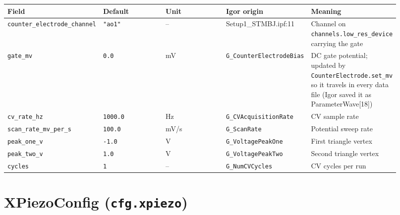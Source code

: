 \footnotesize\setlength{\LTleft}{0pt}\setlength{\LTright}{\fill}
\begin{longtable}{@{}>{\raggedright\arraybackslash}p{0.184\linewidth}>{\raggedright\arraybackslash}p{0.184\linewidth}>{\raggedright\arraybackslash}p{0.184\linewidth}>{\raggedright\arraybackslash}p{0.184\linewidth}>{\raggedright\arraybackslash}p{0.184\linewidth}@{}}
\toprule
\textbf{Field} & \textbf{Default} & \textbf{Unit} & \textbf{Igor origin} & \textbf{Meaning} \\
\midrule\endhead
\texttt{counter\_\discretionary{}{}{}electrode\_\discretionary{}{}{}channel} & \texttt{"ao1"} & -- & Setup1\_STMBJ.ipf:11 & Channel on \texttt{channels.\discretionary{}{}{}low\_\discretionary{}{}{}res\_\discretionary{}{}{}device} carrying the gate \\
\texttt{gate\_\discretionary{}{}{}mv} & \texttt{0.\discretionary{}{}{}0} & mV & \texttt{G\_\discretionary{}{}{}Counter\discretionary{}{}{}Electrode\discretionary{}{}{}Bias} & DC gate potential; updated by \texttt{Counter\discretionary{}{}{}Electrode.\discretionary{}{}{}set\_\discretionary{}{}{}mv} so it travels in every data file (Igor saved it as ParameterWave[18]) \\
\texttt{cv\_\discretionary{}{}{}rate\_\discretionary{}{}{}hz} & \texttt{1000.\discretionary{}{}{}0} & Hz & \texttt{G\_\discretionary{}{}{}CVAcquisition\discretionary{}{}{}Rate} & CV sample rate \\
\texttt{scan\_\discretionary{}{}{}rate\_\discretionary{}{}{}mv\_\discretionary{}{}{}per\_\discretionary{}{}{}s} & \texttt{100.\discretionary{}{}{}0} & mV/s & \texttt{G\_\discretionary{}{}{}Scan\discretionary{}{}{}Rate} & Potential sweep rate \\
\texttt{peak\_\discretionary{}{}{}one\_\discretionary{}{}{}v} & \texttt{-1.\discretionary{}{}{}0} & V & \texttt{G\_\discretionary{}{}{}Voltage\discretionary{}{}{}Peak\discretionary{}{}{}One} & First triangle vertex \\
\texttt{peak\_\discretionary{}{}{}two\_\discretionary{}{}{}v} & \texttt{1.\discretionary{}{}{}0} & V & \texttt{G\_\discretionary{}{}{}Voltage\discretionary{}{}{}Peak\discretionary{}{}{}Two} & Second triangle vertex \\
\texttt{cycles} & \texttt{1} & -- & \texttt{G\_\discretionary{}{}{}Num\discretionary{}{}{}CVCycles} & CV cycles per run \\
\bottomrule
\end{longtable}
\normalsize

\section{XPiezoConfig (\texttt{cfg.\discretionary{}{}{}xpiezo})}

